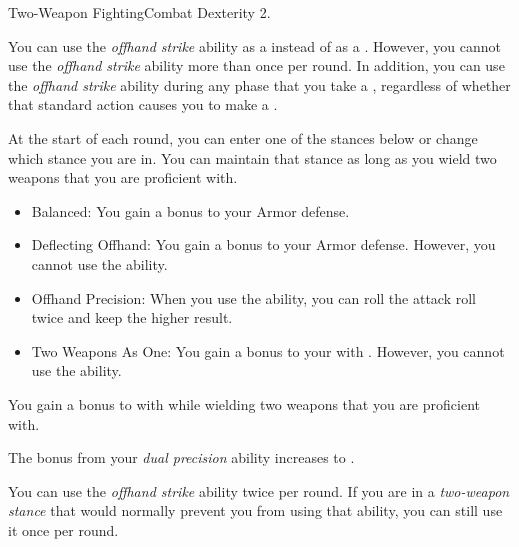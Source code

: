     \begin{feat}{Two-Weapon Fighting}{Combat}
        \featpre Dexterity 2.

         You can use the \textit{offhand strike} ability as a  instead of as a .
        However, you cannot use the \textit{offhand strike} ability more than once per round.
        In addition, you can use the \textit{offhand strike} ability during any phase that you take a , regardless of whether that standard action causes you to make a .

         At the start of each round, you can enter one of the stances below or change which stance you are in.
        You can maintain that stance as long as you wield two weapons that you are proficient with.
        \begin{itemize}
            \item Balanced: You gain a  bonus to your Armor defense.
            \item Deflecting Offhand: You gain a  bonus to your Armor defense.
                However, you cannot use the  ability.
            \item Offhand Precision: When you use the  ability, you can roll the attack roll twice and keep the higher result.
            \item Two Weapons As One: You gain a  bonus to your  with .
                However, you cannot use the  ability.
        \end{itemize}

         You gain a  bonus to  with  while wielding two weapons that you are proficient with.

         The bonus from your \textit{dual precision} ability increases to .

         You can use the \textit{offhand strike} ability twice per round.
        If you are in a \textit{two-weapon stance} that would normally prevent you from using that ability, you can still use it once per round.
    \end{feat}

